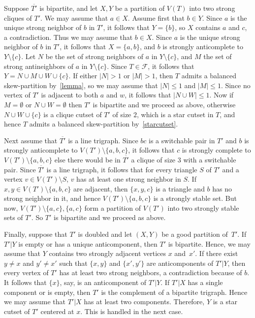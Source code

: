 \documentclass[11 pt] {article}
\begin{document}
Suppose $\overline{T'}$ is bipartite, and let $X,Y$ be a partition of
$V(T)$ into two strong cliques of $T'$. We may assume that $a \in
X$. Assume first that $b \in Y$. Since $a$ is the unique strong
neighbor of $b$ in $T'$, it follows that $Y=\{b\}$, so $X$ contains
$a$ and $c$, a contradiction. Thus we may assume that $b \in X$. Since
$a$ is the unique strong neighbor of $b$ in $T'$, it follows that
$X=\{a,b\}$, and $b$ is strongly anticomplete to $Y \setminus
\{c\}$. Let $N$ be the set of strong neighbors of $a$ in $Y \setminus
\{c\}$, and $M$ the set of strong antineighbors of $a$ in $Y \setminus
\{c\}$. Since $T \in \mathcal{F}$, it follows that $Y=N \cup M \cup W
\cup \{c\}$. If either $|N|>1$ or $|M|>1$, then $T$ admits a balanced
skew-partition by~\ref{lemma}, so we may assume that $|N| \leq 1$ and
$|M| \leq 1$. Since no vertex of $T'$ is adjacent to both $a$ and $w$,
it follows that $|N \cup W| \leq 1$. Now if $M=\emptyset$ or $N\cup
W=\emptyset$ then $T'$ is bipartite and we proceed as above, otherwise
$N\cup W\cup \{c\}$ is a clique cutset of $T'$ of size $2$, which is a
star cutset in $T$, and hence $T$ admits a balanced skew-partition
by~\ref{starcutset}.

Next assume that $\overline{T'}$ is a line trigraph. Since $bc$ is a
switchable pair in $T'$ and $b$ is strongly anticomplete to $V(T')
\setminus \{a,b,c\}$, it follows that $c$ is strongly complete to
$V(T') \setminus \{a,b,c\}$ else there would be in $\overline{T'}$ a
clique of size $3$ with a switchable pair. Since $\overline{T'}$ is
a line trigraph, it follows that for every triangle $S$ of $T'$ and a
vertex $v \in V(T') \setminus S$, $v$ has at least one strong neighbor
in $S$. If $x,y \in V(T') \setminus \{a,b,c\}$ are adjacent, then
$\{x,y,c\}$ is a triangle and $b$ has no strong neighbor in it, and
hence $V(T') \setminus \{a,b,c\}$ is a strongly stable set. But now,
$V(T') \setminus \{a,c\}, \{a,c\}$ form a partition of $V(T')$ into
two strongly stable sets of $T'$.  So $T'$ is bipartite and we proceed as
above.

Finally, suppose that $T'$ is doubled and let $(X, Y)$ be a good
partition of~$T'$.  If $T'|Y$ is empty or has a unique anticomponent,
then $T'$ is bipartite.  Hence, we may assume that $Y$ contains two
strongly adjacent vertices $x$ and~$x'$.  If there exist $y\neq x$ and
$y'\neq x'$ such that $\{x, y\}$ and $\{x', y'\}$ are anticomponents
of $T'|Y$, then every vertex of $T'$ has at least two strong
neighbors, a contradiction because of $b$.  It follows that $\{x\}$,
say, is an anticomponent of $T'|Y$.  If $T'|X$ has a single component or
is empty, then $T'$ is the complement of a bipartite trigraph.  Hence
we may assume that $T'|X$ has at least two components.  Therefore, $Y$
is a star cutset of $T'$ centered at $x$.  This is handled in the next
case.
\end{document}
